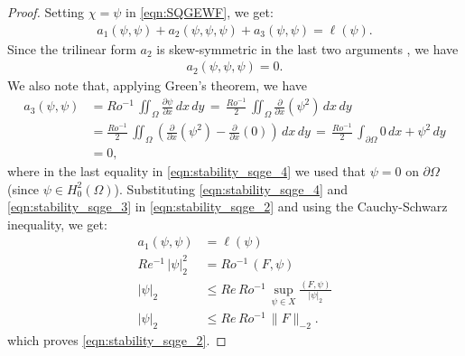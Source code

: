 \begin{proof}
Setting $\chi = \psi$ in \eqref{eqn:SQGEWF}, we get:
\begin{align}
  a_1(\psi, \psi) + a_2(\psi,\psi, \psi) + a_3(\psi, \psi)
= \ell(\psi) .
\label{eqn:stability_sqge_2}
\end{align}
Since the trilinear form $a_2$ is skew-symmetric in the last two arguments
\cite{Girault79,Girault86,Gunzburger89}, we have
\begin{align}
  a_2(\psi,\psi, \psi) = 0 .
  \label{eqn:stability_sqge_3}
\end{align}
We also note that, applying Green's theorem, we have
\begin{align}
  a_3(\psi,\psi) &= Ro^{-1} \, \iint_{\Omega} \frac{\partial \psi}{\partial x} \, dx \, dy
    \, = \, \frac{Ro^{-1}}{2} \, \iint_{\Omega} \frac{\partial}{\partial x} (\psi^2) \, dx \, dy \nonumber \\
  &= \frac{Ro^{-1}}{2} \, \iint_{\Omega} \left( \frac{\partial}{\partial x} (\psi^2)
    - \frac{\partial}{\partial x} (0) \right) \, dx \, dy
    \, = \,  \frac{Ro^{-1}}{2} \, \int_{\partial \Omega} 0 \, dx + \psi^2 \, dy \nonumber \\
  &= 0 ,
\label{eqn:stability_sqge_4}
\end{align}
where in the last equality in \eqref{eqn:stability_sqge_4} we used that $\psi =
0$ on $\partial \Omega$ (since $\psi \in H_0^2(\Omega)$).  Substituting
\eqref{eqn:stability_sqge_4} and \eqref{eqn:stability_sqge_3} in
\eqref{eqn:stability_sqge_2} and using the Cauchy-Schwarz inequality, we get:
\begin{align}
  a_1(\psi,\psi) &= \ell(\psi) \nonumber \\
  Re^{-1}\, |\psi|_2^2 &= Ro^{-1}\, (F,\psi) \\
  |\psi|_2 &\le Re\, Ro^{-1}\,\sup_{\psi \in X} \frac{(F,\psi)}{|\psi|_2} \nonumber \\
  |\psi|_2 &\le Re\, Ro^{-1}\, \|F\|_{-2}.
  \label{eqn:stability_sqge_5}
\end{align}
which proves \eqref{eqn:stability_sqge_2}.
\end{proof}
